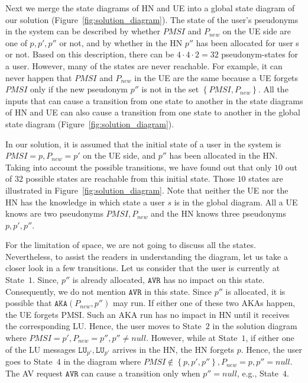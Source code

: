 \documentclass{llncs} %
\begin{document}
Next we merge the state diagrams of HN and UE into a global state diagram of our solution (Figure~\ref{fig:solution_diagram}). The state of the user's pseudonyms in the system can be described by whether $PMSI$ and $P_{new}$ on the UE side are one of $p, p', p''$ or not, and by whether in the HN $p''$ has been allocated for user s or not. Based on this description, there can be $4\cdot4\cdot2 = 32$ pseudonym-states for a user. However, many of the states are never reachable. For example, it can never happen that $PMSI$ and $P_{new}$ in the UE are the same because a UE forgets $PMSI$ only if the new pseudonym $p''$ is not in the set $\left\lbrace PMSI,P_{new} \right\rbrace$. All the inputs that can cause a transition from one state to another in the state diagrams of HN and UE can also cause a transition from one state to another in the global state diagram (Figure~\ref{fig:solution_diagram}). 

In our solution, it is assumed that the initial state of a user in the system is $PMSI=p, P_{new}=p'$ on the UE side, and $p''$ has been allocated in the HN. Taking into account the possible transitions, we have found out that only $10$ out of $32$ possible states are reachable from this initial state. Those $10$ states are illustrated in Figure~\ref{fig:solution_diagram}. Note that neither the UE nor the HN has the knowledge in which state a user $s$ is in the global diagram. All a UE knows are two pseudonyms $PMSI,P_{new}$ and the HN knows three pseudonyms $p,p',p''$. 

For the limitation of space, we are not going to discuss all the states. Nevertheless, to assist the readers in understanding the diagram, let us take a closer look in a few transitions. Let us consider that the user is currently at State~$1$. Since, $p''$ is already allocated, $\texttt{AVR}$ has no impact on this state. Consequently, we do not mention $\texttt{AVR}$ in this state. Since $p''$ is allocated, it is possible that $\texttt{AKA}(P_{new},p'')$ may run. If either one of these two AKAs happen, the UE forgets PMSI. Such an AKA run has no impact in HN until it receives the corresponding LU. Hence, the user moves to State~$2$ in the solution diagram where $PMSI = p', P_{new} = p'', p'' \neq null$. However, while at State~$1$, if either one of the LU messages $\texttt{LU}_{p'}, \texttt{LU}_{p'}$ arrives in the HN, the HN forgets $p$. Hence, the user goes to State~$4$ in the diagram where $PMSI \notin \left\lbrace p,p',p'' \right\rbrace, P_{new} = p, p'' = null$. The AV request $\texttt{AVR}$ can cause a transition only when $p''=null$, e.g., State~$4$.
\end{document}
